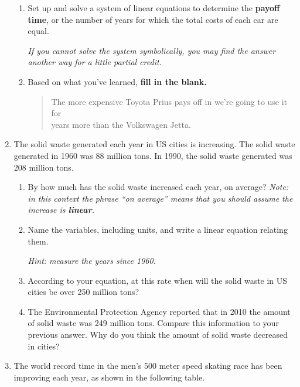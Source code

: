\documentclass[12pt]{article}
\begin{document}
\begin{enumerate}
\begin{enumerate}
\item Set up and solve a system of linear equations to determine the \textbf{payoff time}, or the number of years for which the total costs of each car are equal.

\emph{If you cannot solve the system symbolically, you may find the answer another way for a little partial credit.}
\vfill

\item Based on what you've learned, \textbf{fill in the blank.}

\begin{quote}
The more expensive Toyota Prius pays off in we're going to use it for \hrulefill   \\
years more than the Volkswagen Jetta.  
\end{quote}

\end{enumerate}
\newpage


\item The solid waste generated each year in US cities is increasing.  The solid waste generated in 1960 was 88 million tons. In 1990, the solid waste generated was 208 million tons.  

\begin{enumerate}
\item By how much has the solid waste increased each year, on average?  \emph{Note:  in this context the phrase ``on average'' means that you should assume the increase is \textbf{linear}.}
\vfill
\item Name the variables, including units, and write a linear equation relating them.

\emph{Hint:  measure the years since 1960.}
\vfill
\item According to your equation, at this rate when will the solid waste in US cities be over 250 million tons?
\vfill
\item The Environmental Protection Agency reported that in 2010 the amount of solid waste was 249 million tons.  Compare this information to your previous answer.  Why do you think the amount of solid waste decreased in cities?
\vfill
\end{enumerate}


\newpage %


\item The world record time in the men's 500 meter speed skating race has been improving each year, as shown in the following table.


\end{enumerate}
\end{document}
